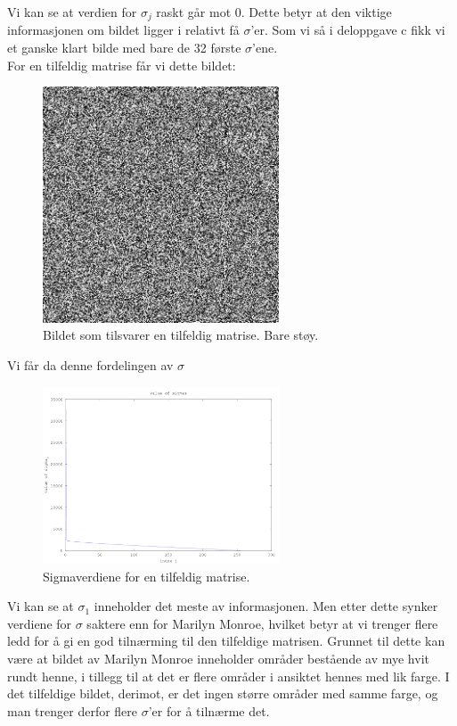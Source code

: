 \documentclass[a4paper,norsk, 10pt]{article}
\begin{document}
Vi kan se at verdien for $\sigma_j$ raskt går mot 0. Dette betyr at den viktige informasjonen om bildet ligger i relativt få $\sigma$'er. Som vi så i deloppgave c fikk vi et ganske klart bilde med bare de 32 første $\sigma$'ene.\\

For en tilfeldig matrise får vi dette bildet:

\begin{figure}[H]
\begin{center}
\includegraphics[width = 70mm]{randomPic.png}
\caption{Bildet som tilsvarer en tilfeldig matrise. Bare støy.}
\end{center}
\end{figure}

Vi får da denne fordelingen av $\sigma$

\begin{figure}[H]
\begin{center}
\includegraphics[width = 70mm]{random.png}
\caption{Sigmaverdiene for en tilfeldig matrise.}
\end{center}
\end{figure}

Vi kan se at $\sigma_1$ inneholder det meste av informasjonen. Men etter dette synker verdiene for $\sigma$ saktere enn for Marilyn Monroe, hvilket betyr at vi trenger flere ledd for å gi en god tilnærming til den tilfeldige matrisen. Grunnet til dette kan være at bildet av Marilyn Monroe inneholder områder bestående av mye hvit rundt henne, i tillegg til at det er flere områder i ansiktet hennes med lik farge. I det tilfeldige bildet, derimot, er det ingen større områder med samme farge, og man trenger derfor flere $\sigma$'er for å tilnærme det. 
\end{document}
